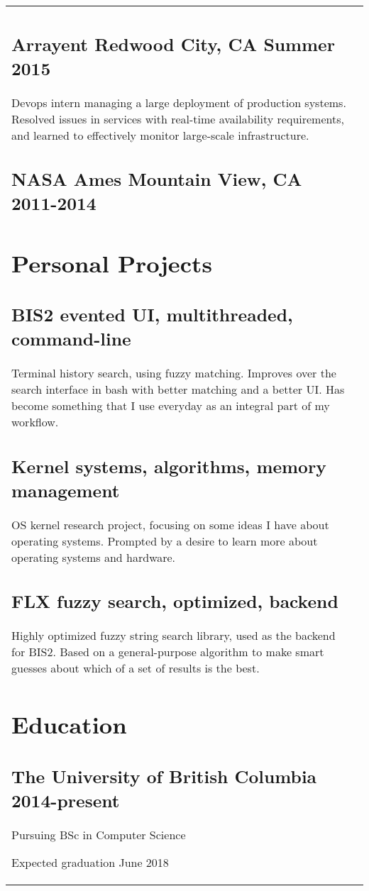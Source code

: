 \documentclass[letterpaper]{article}
\newlength{\leftcol}
\newlength{\rightcol}
\newcommand{\subtitle}{\normalfont\sffamily\color{black}\large}
\begin{document}
\begin{tabularx}{\textwidth}{@{}p{\leftcol} p{\rightcol}}
\subsection*{Arrayent \subtitle Redwood City, CA Summer 2015}

Devops intern managing a large deployment of production systems. Resolved issues
in services with real-time availability requirements, and learned to effectively
monitor large-scale infrastructure.

\subsection*{NASA Ames \subtitle Mountain View, CA 2011-2014}

\section*{Personal Projects}

\subsection*{BIS2 \subtitle evented UI, multithreaded, command-line}

Terminal history search, using fuzzy matching. Improves over the search interface
in bash with better matching and a better UI. Has become something that I use
everyday as an integral part of my workflow.

\subsection*{Kernel \subtitle systems, algorithms, memory management}

OS kernel research project, focusing on some ideas I have about operating
systems. Prompted by a desire to learn more about operating systems and
hardware.

\subsection*{FLX \subtitle fuzzy search, optimized, backend}

Highly optimized fuzzy string search library, used as the backend for BIS2.
Based on a general-purpose algorithm to make smart guesses about which of a set
of results is the best.

\section*{Education}

\subsection*{The University of British Columbia \subtitle 2014-present}

Pursuing BSc in Computer Science

Expected graduation June 2018
\end{tabularx}
\end{document}
